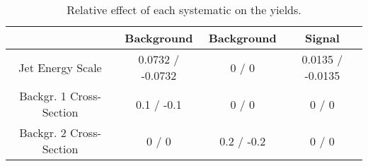 \documentclass[10pt]{article}
\begin{document}
\begin{table}[htbp]
\begin{center}
\begin{tabular}{|c|c|c|c|}
\hline 
      & Background      & Background      & Signal \\ 
\hline 
  Jet Energy Scale & 0.0732 / -0.0732 & 0 / 0 & 0.0135 / -0.0135 \\ 
  Backgr. 1 Cross-Section & 0.1 / -0.1 & 0 / 0 & 0 / 0 \\ 
  Backgr. 2 Cross-Section & 0 / 0 & 0.2 / -0.2 & 0 / 0 \\ 
\hline 
\end{tabular} 
\caption{Relative effect of each systematic on the yields.} 
\end{center} 
\end{table} 
\end{document}
